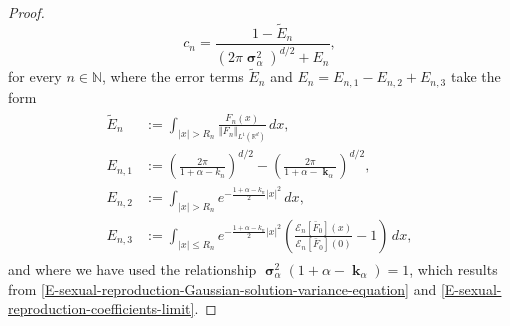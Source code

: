 \documentclass[reqno]{amsart}
\DeclareMathOperator{\bsigma}{\boldsymbol{\sigma}}
\DeclareMathOperator{\bk}{\boldsymbol{k}}
\numberwithin{equation}{section}
\begin{document}
{\begin{proof}
\begin{equation}
c_n=\frac{1-\tilde{E}_n}{(2\pi\bsigma_\alpha^2)^{d/2}+E_n},
\end{equation}
for every $n\in \mathbb{N}$, where the error terms $\tilde{E}_n$ and $E_n=E_{n,1}-E_{n,2}+E_{n,3}$ take the form
\begin{align}\label{E-convergence-ratios-max-mass-errors}
\begin{aligned}
\tilde{E}_n&:=\int_{\vert x\vert>R_n}\frac{F_n(x)}{\Vert F_n\Vert_{L^1(\mathbb{R}^d)}}\,dx,\\
E_{n,1}&:=\left(\frac{2\pi}{1+\alpha-k_n}\right)^{d/2}-\left(\frac{2\pi}{1+\alpha-\bk_\alpha}\right)^{d/2},\\
E_{n,2}&:=\int_{\vert x\vert>R_n}e^{-\frac{1+\alpha-k_n}{2}\vert x\vert^2}\,dx,\\
E_{n,3}&:=\int_{\vert x\vert\leq R_n}e^{-\frac{1+\alpha-k_n}{2}\vert x\vert^2}\left(\frac{\mathcal{E}_n[\bar F_0](x)}{\mathcal{E}_n[\bar F_0](0)}-1\right)\,dx,
\end{aligned}
\end{align}
and where we have used the relationship $\bsigma_\alpha^2(1+\alpha-\bk_\alpha) = 1$, which results from \eqref{E-sexual-reproduction-Gaussian-solution-variance-equation} and \eqref{E-sexual-reproduction-coefficients-limit}.


\end{proof}}
\end{document}
